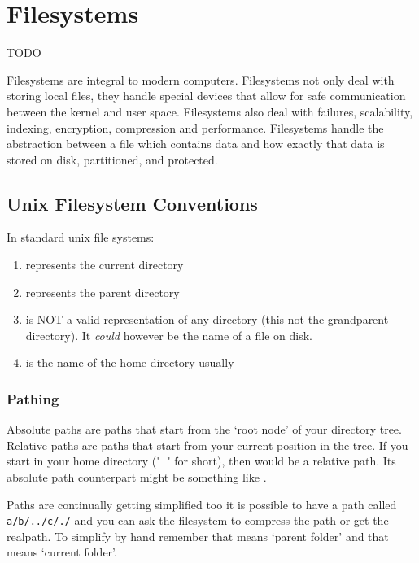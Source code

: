 \chapter{Filesystems}

\epigraph{TODO}{}

Filesystems are integral to modern computers. Filesystems not only deal with storing local files, they handle special devices that allow for safe communication between the kernel and user space. Filesystems also deal with failures, scalability, indexing, encryption, compression and performance. Filesystems handle the abstraction between a file which contains data and how exactly that data is stored on disk, partitioned, and protected.



\section{Unix Filesystem Conventions}

In standard unix file systems: 

\begin{enumerate}

\item {} represents the current directory
\item {} represents the parent directory
\item {} is NOT a valid representation of any directory (this not the grandparent directory). It \emph{could} however be the name of a file on disk.
\item \keyword{~} is the name of the home directory usually
\end{enumerate}

\subsection{Pathing}

Absolute paths are paths that start from the `root node' of your directory tree. Relative paths are paths that start from your current position in the tree. If you start in your home directory ("~" for short), then  would be a relative path. Its absolute path counterpart might be something like .

Paths are continually getting simplified too it is possible to have a path called \texttt{a/b/../c/./} and you can ask the filesystem to compress the path or get the realpath. To simplify by hand remember that  means `parent folder' and that  means `current folder'.

